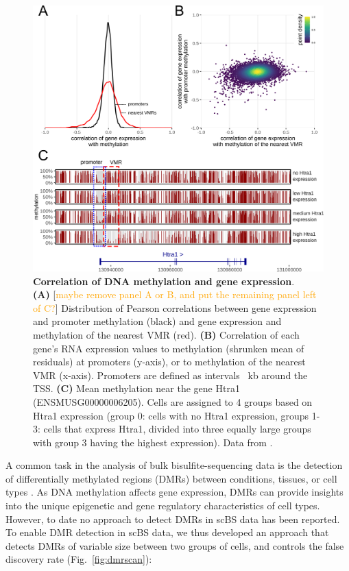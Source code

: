 \documentclass[twocolumn,10pt]{article}
\newcommand{\todo}[1]{[\textcolor{orange}{#1}]}
\begin{document}
\begin{figure}
	\begin{center}
		\includegraphics[width=.65\textwidth]{figures/Fig_correlation.png}
	\end{center}
	\caption{\small \textbf{Correlation of DNA methylation and gene expression}.\\
		\textbf{(A)} \todo{maybe remove panel A or B, and put the remaining panel left of C?} Distribution of Pearson correlations between gene expression and promoter methylation (black) and gene expression and methylation of the nearest VMR (red).
		\textbf{(B)} Correlation of each gene's RNA expression values to methylation (shrunken mean of residuals) at promoters (y-axis), or to methylation of the nearest VMR (x-axis).
		Promoters are defined as intervals ~kb around the TSS.
		\textbf{(C)} Mean methylation near the gene Htra1 (ENSMUSG00000006205).
		Cells are assigned to 4 groups based on Htra1 expression (group 0: cells with no Htra1 expression, groups 1-3: cells that express Htra1, divided into three equally large groups with group 3 having the highest expression).
		Data from \citet{kremer_scnmt}.}
	\label{fig:correlation}
\end{figure}

A common task in the analysis of bulk bisulfite-sequencing data is the detection of differentially methylated regions (DMRs) between conditions, tissues, or cell types \citep{Hebestreit2013, dmrseq}.
As DNA methylation affects gene expression, DMRs can provide insights into the unique epigenetic and gene regulatory characteristics of cell types.
However, to date no approach to detect DMRs in scBS data has been reported.
To enable DMR detection in scBS data, we thus developed an approach that detects DMRs of variable size between two groups of cells, and controls the false discovery rate (Fig.~\ref{fig:dmrscan}):
\end{document}
